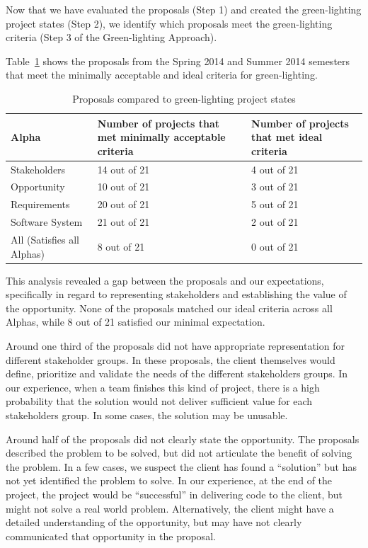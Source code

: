 \documentclass[conference]{IEEEtran}
\begin{document}
Now that we have evaluated the proposals (Step 1) and created the
green-lighting project states (Step 2), we identify which proposals
meet the green-lighting criteria (Step 3 of the Green-lighting Approach). 

Table~\ref{table_proposal_evaluations} shows the proposals from the Spring 2014 and Summer 2014 semesters that meet the minimally acceptable and ideal criteria for green-lighting. 

\begin{table}
\caption{Proposals compared to green-lighting project states}
\label{table_proposal_evaluations}
\begin{tabular}{|p{1.10in}|p{0.95in}|p{0.95in}|}
\hline
Alpha & Number of projects that met minimally acceptable criteria & Number of projects that met ideal criteria \\ \hline
Stakeholders & 14 out of 21 & 4 out of 21 \\ \hline
Opportunity & 10 out of 21 & 3 out of 21 \\ \hline
Requirements & 20 out of 21 & 5 out of 21 \\ \hline
Software System & 21 out of 21 & 2 out of 21 \\ \hline
All (Satisfies all Alphas) & 8 out of 21 & 0 out of 21 \\ \hline
\end{tabular}
\end{table}

This analysis revealed a gap between the proposals and our
expectations, specifically in regard to representing stakeholders and
establishing the value of the opportunity. None of the proposals matched our ideal criteria across all Alphas, while 8 out of 21 satisfied our minimal expectation.

Around one third of the proposals did not have appropriate
representation for different stakeholder groups. In these proposals, the
client themselves would define, prioritize and validate the needs of the
different stakeholders groups. In our experience, when a team finishes
this kind of project, there is a high probability that the solution
would not deliver sufficient value for each stakeholders group. In some
cases, the solution may be unusable.

Around half of the proposals did not clearly state the
opportunity. The proposals described the problem to be solved, but did
not articulate the benefit of solving the problem. In a few cases, we
suspect the client has found a ``solution'' but has not yet identified
the problem to solve. In our experience, at the end of the project,
the project would be ``successful'' in delivering code to the client,
but might not solve a real world problem. Alternatively, the client
might have a detailed understanding of the opportunity, but may have not
clearly communicated that opportunity in the proposal.
\end{document}
